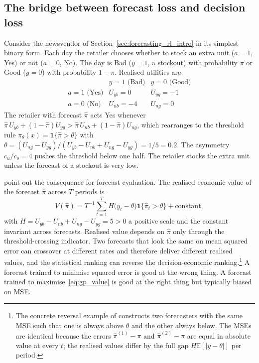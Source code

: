 \subsection{The bridge between forecast loss and decision loss}
\label{sec:bridge}

Consider the newsvendor of Section~\ref{sec:forecasting_rl_intro} in its
simplest binary form. Each day the retailer chooses whether to stock an
extra unit ($a = 1$, Yes) or not ($a = 0$, No). The day is Bad ($y = 1$, a
stockout) with probability $\pi$ or Good ($y = 0$) with probability
$1 - \pi$. Realised utilities are
\begin{equation}
\begin{array}{c|cc}
                  & y = 1 \text{ (Bad)} & y = 0 \text{ (Good)} \\ \hline
a = 1 \text{ (Yes)} & U_{yb} = 0           & U_{yg} = -1 \\
a = 0 \text{ (No)}  & U_{nb} = -4          & U_{ng} = 0
\end{array}
\label{eq:gp_payoff_table}
\end{equation}
The retailer with forecast $\hat\pi$ acts Yes whenever
$\hat\pi\, U_{yb} + (1 - \hat\pi) U_{yg} > \hat\pi\, U_{nb} +
(1 - \hat\pi) U_{ng}$, which rearranges to the threshold rule
$\pi_\theta(x) = \mathbf 1\{\hat\pi > \theta\}$ with
$\theta = (U_{ng} - U_{yg}) / (U_{yb} - U_{nb} + U_{ng} - U_{yg})
= 1/5 = 0.2$. The asymmetry $c_u / c_o = 4$ pushes the threshold below
one half. The retailer stocks the extra unit unless the forecast of a
stockout is very low.

\citet{GrangerPesaran2000} point out the consequence for forecast
evaluation. The realised economic value of the forecast $\hat\pi$ across
$T$ periods is
\begin{equation}
V(\hat\pi)
= T^{-1} \sum_{t=1}^T H \bigl(y_t - \theta\bigr)
  \mathbf 1\{\hat\pi_t > \theta\}
  + \text{constant},
\label{eq:gp_value}
\end{equation}
with $H = U_{yb} - U_{nb} + U_{ng} - U_{yg} = 5 > 0$ a positive scale and
the constant invariant across forecasts. Realised value depends on
$\hat\pi$ only through the threshold-crossing indicator. Two forecasts that
look the same on mean squared error can crossover at different rates and
therefore deliver different realised values, and the statistical ranking
can reverse the decision-economic ranking.\footnote{The concrete reversal
example of \citet{GrangerPesaran2000} constructs two forecasters with the
same MSE such that one is always above $\theta$ and the other always
below. The MSEs are identical because the errors $\hat\pi^{(1)} - \pi$ and
$\hat\pi^{(2)} - \pi$ are equal in absolute value at every $t$; the
realised values differ by the full gap $H \mathbb E[|y - \theta|]$ per
period.} A forecast trained to minimise squared error is good at the wrong
thing. A forecast trained to maximise~\eqref{eq:gp_value} is good at the
right thing but typically biased on MSE.

